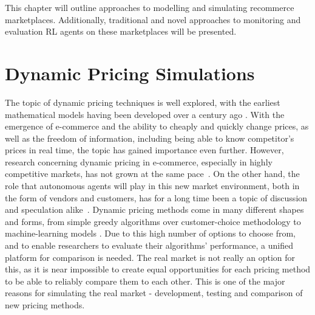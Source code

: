 \begin{jointwork}\label{ch:RelatedWork}
	This chapter will outline approaches to modelling and simulating recommerce marketplaces. Additionally, traditional and novel approaches to monitoring and evaluation RL agents on these marketplaces will be presented.
\end{jointwork}

\section{Dynamic Pricing Simulations}

The topic of dynamic pricing techniques is well explored, with the earliest mathematical models having been developed over a century ago \cite{DynamicPricingHistory}. With the emergence of e-commerce and the ability to cheaply and quickly change prices, as well as the freedom of information, including being able to know competitor's prices in real time, the topic has gained importance even further. However, research concerning dynamic pricing in e-commerce, especially in highly competitive markets, has not grown at the same pace~\cite{PricingEcommerceGrowth}. On the other hand, the role that autonomous agents will play in this new market environment, both in the form of vendors and customers, has for a long time been a topic of discussion and speculation alike~\cite{PricingBySoftwareAgents}. Dynamic pricing methods come in many different shapes and forms, from simple greedy algorithms over customer-choice methodology to machine-learning models \cite{deGeerPricing}. Due to this high number of options to choose from, and to enable researchers to evaluate their algorithms' performance, a unified platform for comparison is needed. The real market is not really an option for this, as it is near impossible to create equal opportunities for each pricing method to be able to reliably compare them to each other. This is one of the major reasons for simulating the real market - development, testing and comparison of new pricing methods.

